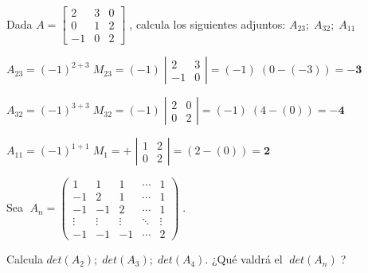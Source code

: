 \begin{ejre}
Dada $A=\left[ \begin{matrix}2&3&0\\0&1&2\\-1&0&2 \end{matrix} \right]\;$, calcula los siguientes adjuntos: $A_{23}; \; A_{32}; \; A_{11}$
\end{ejre}

\begin{proofw}\renewcommand{\qedsymbol}{$\diamond$}

$A_{23}=(-1)^{2+3}\;M_{23}= (-1)\; \left| \begin{matrix} 2&3\\-1&0
 \end{matrix} \right|= (-1)\; (0-(-3)) = \boldsymbol{-3}$
 
\noindent $A_{32}=(-1)^{3+3}\;M_{32}= (-1)\; \left| \begin{matrix} 2&0\\0&2
 \end{matrix} \right|= (-1)\; (4-(0)) = \boldsymbol{-4}$	
 
\noindent $A_{11}=(-1)^{1+1}\;M_{1}= +\; \left| \begin{matrix} 1&2\\0&2
 \end{matrix} \right|=  (2-(0)) = \boldsymbol{2}$
\end{proofw}

\begin{ejre}
	Sea $\; A_n=\left( \begin{matrix}
 1&1&1&\cdots&1 \\ -1&2&1&\cdots &1	\\ -1&-1&2&\cdots &1 \\ \vdots & \vdots & \vdots & \ddots & \vdots \\-1&-1&-1& \cdots &2
 \end{matrix} \right)\; $. 
 
 Calcula $det(A_2); \; det(A_3); \; det(A_4)$. ¿Qué valdrá el $\; det(A_n)\; $?

\end{ejre}

